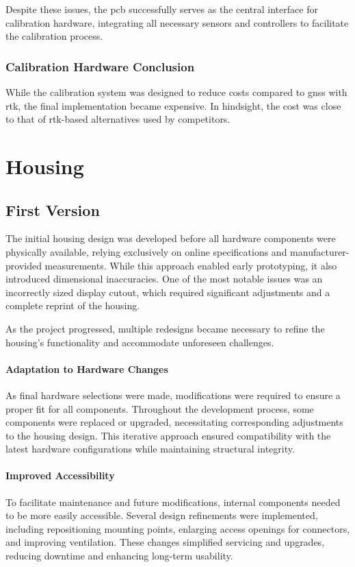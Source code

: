 Despite these issues, the \acrshort{pcb} successfully serves as the central interface for calibration hardware, integrating all necessary sensors and controllers to facilitate the calibration process.

\subsubsection*{Calibration Hardware Conclusion}
While the calibration system was designed to reduce costs compared to \acrshort{gnss} with \acrshort{rtk}, the final implementation became expensive. In hindsight, the cost was close to that of \acrshort{rtk}-based alternatives used by competitors.

\section{Housing}
\subsection{First Version}  

The initial housing design was developed before all hardware components were physically available, relying exclusively on online specifications and manufacturer-provided measurements. While this approach enabled early prototyping, it also introduced dimensional inaccuracies. One of the most notable issues was an incorrectly sized display cutout, which required significant adjustments and a complete reprint of the housing.  

As the project progressed, multiple redesigns became necessary to refine the housing’s functionality and accommodate unforeseen challenges.

\paragraph{Adaptation to Hardware Changes}  
As final hardware selections were made, modifications were required to ensure a proper fit for all components. Throughout the development process, some components were replaced or upgraded, necessitating corresponding adjustments to the housing design. This iterative approach ensured compatibility with the latest hardware configurations while maintaining structural integrity.  

\paragraph{Improved Accessibility}  
To facilitate maintenance and future modifications, internal components needed to be more easily accessible. Several design refinements were implemented, including repositioning mounting points, enlarging access openings for connectors, and improving ventilation. These changes simplified servicing and upgrades, reducing downtime and enhancing long-term usability.  

